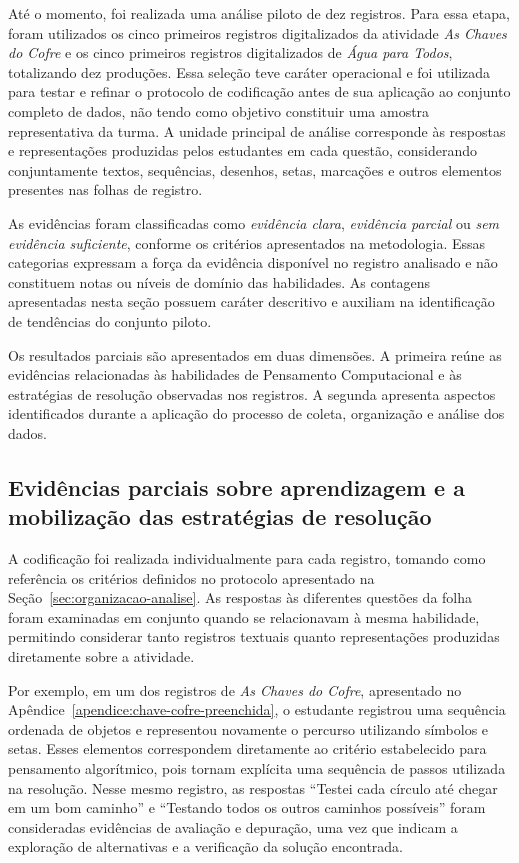 Até o momento, foi realizada uma análise piloto de dez registros. Para essa etapa, foram utilizados os cinco primeiros registros digitalizados da atividade \textit{As Chaves do Cofre} e os cinco primeiros registros digitalizados de \textit{Água para Todos}, totalizando dez produções. Essa seleção teve caráter operacional e foi utilizada para testar e refinar o protocolo de codificação antes de sua aplicação ao conjunto completo de dados, não tendo como objetivo constituir uma amostra representativa da turma. A unidade principal de análise corresponde às respostas e representações produzidas pelos estudantes em cada questão, considerando conjuntamente textos, sequências, desenhos, setas, marcações e outros elementos presentes nas folhas de registro.

As evidências foram classificadas como \textit{evidência clara}, \textit{evidência parcial} ou \textit{sem evidência suficiente}, conforme os critérios apresentados na metodologia. Essas categorias expressam a força da evidência disponível no registro analisado e não constituem notas ou níveis de domínio das habilidades. As contagens apresentadas nesta seção possuem caráter descritivo e auxiliam na identificação de tendências do conjunto piloto.

Os resultados parciais são apresentados em duas dimensões. A primeira reúne as evidências relacionadas às habilidades de Pensamento Computacional e às estratégias de resolução observadas nos registros. A segunda apresenta aspectos identificados durante a aplicação do processo de coleta, organização e análise dos dados.

\subsection{Evidências parciais sobre aprendizagem e a mobilização das estratégias de resolução}

A codificação foi realizada individualmente para cada registro, tomando como referência os critérios definidos no protocolo apresentado na Seção~\ref{sec:organizacao-analise}. As respostas às diferentes questões da folha foram examinadas em conjunto quando se relacionavam à mesma habilidade, permitindo considerar tanto registros textuais quanto representações produzidas diretamente sobre a atividade.

Por exemplo, em um dos registros de \textit{As Chaves do Cofre}, apresentado no Apêndice~\ref{apendice:chave-cofre-preenchida}, o estudante registrou uma sequência ordenada de objetos e representou novamente o percurso utilizando símbolos e setas. Esses elementos correspondem diretamente ao critério estabelecido para pensamento algorítmico, pois tornam explícita uma sequência de passos utilizada na resolução. Nesse mesmo registro, as respostas ``Testei cada círculo até chegar em um bom caminho'' e ``Testando todos os outros caminhos possíveis'' foram consideradas evidências de avaliação e depuração, uma vez que indicam a exploração de alternativas e a verificação da solução encontrada.

